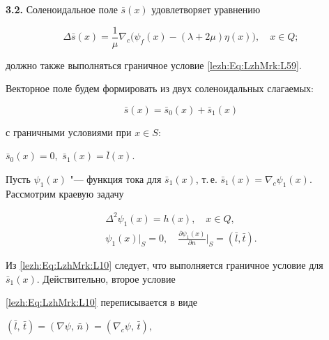 \smallskip



\textbf{3.2.} Соленоидальное поле $\bar{s}(x)$ удовлетворяет уравнению

\begin{equation}

   \label{lezh:Eq:LzhMrk:L8}

   \Delta \bar{s}(x) = \frac{1}{\mu} \nabla_{c} \big( \psi_{f}(x) - (\lambda+2\mu) \eta (x) \big), \quad  x \in Q;

\end{equation}

должно также выполняться граничное условие \eqref{lezh:Eq:LzhMrk:L59}.



Векторное поле будем формировать из двух соленоидальных слагаемых:

\[

   \bar{s}(x) = \bar{s}_0(x) + \bar{s}_1(x)

\]

с граничными условиями при $x \in S$:

$

   \bar{s}_0(x) = 0,$ $\bar{s}_1(x) = \bar{l}(x).

$

Пусть $\psi_{1}(x)$ "--- функция тока для $\bar{s}_{1}(x)$, т.\,е. $\bar{s}_{1}(x) = \nabla_{c} \psi_{1} (x)$. Рассмотрим краевую задачу

\begin{gather}

   \label{lezh:Eq:LzhMrk:L9}

   \Delta^2 \psi_1 (x) = h(x), \quad x \in Q,\\

   \label{lezh:Eq:LzhMrk:L10}

   \psi_1 (x)\big|_S = 0, \quad \frac{\partial \psi_{1} (x)}{\partial n}\Big|_S = (\bar{l},\bar{t}).

\end{gather}



Из \eqref{lezh:Eq:LzhMrk:L10} следует, что выполняется граничное условие для $\bar{s}_1(x)$. Действительно, второе условие

\eqref{lezh:Eq:LzhMrk:L10} переписывается в виде

$

   (\bar{l},\,\bar{t}) = (\nabla \psi,\, \bar{n}) = (\nabla_c \psi,\, \bar{t}),

$

